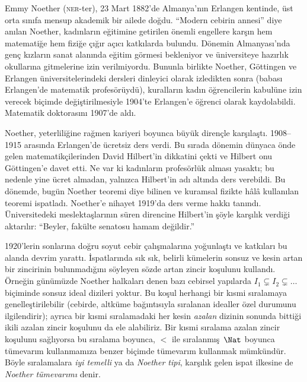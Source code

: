 




Emmy Noether (\textsc{ner}-ter), 23 Mart 1882'de Almanya'nın Erlangen
kentinde, üst orta sınıfa mensup akademik bir ailede doğdu. ``Modern cebirin
annesi'' diye anılan Noether, kadınların eğitimine getirilen önemli engellere
karşın hem matematiğe hem fiziğe çığır açıcı katkılarda bulundu. Dönemin
Almanyası'nda genç kızların sanat alanında eğitim görmesi bekleniyor ve
üniversiteye hazırlık okullarına gitmelerine izin verilmiyordu. Bununla
birlikte Noether, G\"{o}ttingen ve Erlangen üniversitelerindeki dersleri
dinleyici olarak izledikten sonra (babası Erlangen'de matematik profesörüydü),
kuralların kadın öğrencilerin kabulüne izin verecek biçimde değiştirilmesiyle
1904'te Erlangen'e öğrenci olarak kaydolabildi. Matematik doktorasını 1907'de
aldı.

Noether, yeterliliğine rağmen kariyeri boyunca büyük dirençle karşılaştı.
1908--1915 arasında Erlangen'de ücretsiz ders verdi. Bu sırada dönemin
dünyaca önde gelen matematikçilerinden David Hilbert'in dikkatini çekti ve
Hilbert onu G\"{o}ttingen'e davet etti. Ne var ki kadınların profesörlük
alması yasaktı; bu nedenle yine ücret almadan, yalnızca Hilbert'in adı altında
ders verebildi. Bu dönemde, bugün Noether teoremi diye bilinen ve kuramsal
fizikte hâlâ kullanılan teoremi ispatladı. Noether'e nihayet 1919'da ders
verme hakkı tanındı. Üniversitedeki meslektaşlarının süren direncine Hilbert'in
şöyle karşılık verdiği aktarılır: ``Beyler, fakülte senatosu hamam değildir.''

1920'lerin sonlarına doğru soyut cebir çalışmalarına yoğunlaştı ve katkıları
bu alanda devrim yarattı. İspatlarında sık sık, belirli kümelerin sonsuz ve
kesin artan bir zincirinin bulunmadığını söyleyen sözde artan zincir koşulunu
kullandı. Örneğin günümüzde Noether halkaları denen bazı cebirsel yapılarda
$I_1 \subsetneq I_2 \subsetneq \dots$ biçiminde sonsuz ideal dizileri yoktur.
Bu koşul herhangi bir kısmi sıralamaya genelleştirilebilir (cebirde, altküme
bağıntısıyla sıralanan idealler özel durumunu ilgilendirir); ayrıca bir kısmi
sıralamadaki her kesin \emph{azalan} dizinin sonunda bittiği ikili azalan
zincir koşulunu da ele alabiliriz. Bir kısmi sıralama azalan zincir koşulunu
sağlıyorsa bu sıralama boyunca, $<$ ile sıralanmış~$\Nat$ boyunca tümevarım
kullanmamıza benzer biçimde tümevarım kullanmak mümkündür. Böyle
sıralamalara \emph{iyi temelli} ya da \emph{Noether tipi}, karşılık gelen
ispat ilkesine de \emph{Noether tümevarımı} denir.

